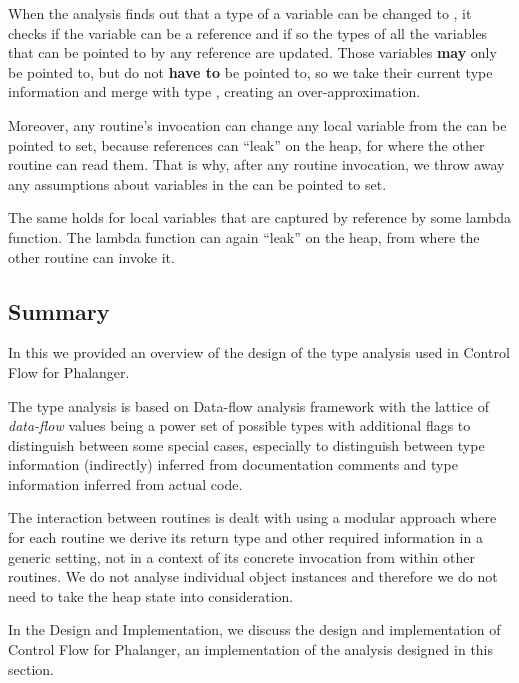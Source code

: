         When the analysis finds out that a type of a variable can 
        be changed to , it checks if the variable can be 
        a reference and if so the types of all the variables that 
        can be pointed to by any reference are updated. Those variables 
        \textbf{may} only be pointed to, but do not \textbf{have to} 
        be pointed to, so we take their current type information 
        and merge with type , creating an over-approximation.
        
        Moreover, any routine's invocation can change any local 
        variable from the can be pointed to set, because 
        references can ``leak'' on the heap, for where 
        the other routine can read them. That is why, after any routine 
        invocation, we throw away any assumptions about variables 
        in the can be pointed to set.
        
        The same holds for local variables that are captured by 
        reference by some lambda function. The lambda function can 
        again ``leak'' on the heap, from where the other routine 
        can invoke it.
        
        \subsection{Summary}
        In this \wsection{} we provided an overview of the design 
        of the type analysis used in Control Flow for Phalanger. 
        
        The type analysis is based on Data-flow analysis framework 
        with the lattice of \emph{data-flow} values being a power set 
        of possible types with additional flags to distinguish 
        between some special cases, especially to distinguish 
        between type information (indirectly) inferred from 
        documentation comments and type information inferred 
        from actual code.
        
        The interaction between routines is dealt with using 
        a modular approach where for each routine we derive 
        its return type and other required information 
        in a generic setting, not in a context of its 
        concrete invocation from within other routines. 
        We do not analyse individual object instances 
        and therefore we do not need to take the heap 
        state into consideration.
        
        In the \wchapter{} Design and Implementation, 
        we discuss the design and implementation of 
        Control Flow for Phalanger, an implementation of 
        the analysis designed in this section.
        